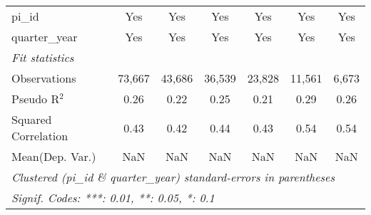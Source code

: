 \begin{tabular}{lcccccc}
   pi\_id                                                     & Yes           & Yes           & Yes           & Yes           & Yes           & Yes\\  
   quarter\_year                                              & Yes           & Yes           & Yes           & Yes           & Yes           & Yes\\  
   \midrule
   \emph{Fit statistics}\\
   Observations                                               & 73,667        & 43,686        & 36,539        & 23,828        & 11,561        & 6,673\\  
   Pseudo R$^2$                                               & 0.26          & 0.22          & 0.25          & 0.21          & 0.29          & 0.26\\  
   Squared Correlation                                        & 0.43          & 0.42          & 0.44          & 0.43          & 0.54          & 0.54\\  
Mean(Dep. Var.) & NaN & NaN & NaN & NaN & NaN & NaN \\
   \midrule \midrule
   \multicolumn{7}{l}{\emph{Clustered (pi\_id \& quarter\_year) standard-errors in parentheses}}\\
   \multicolumn{7}{l}{\emph{Signif. Codes: ***: 0.01, **: 0.05, *: 0.1}}\\
\end{tabular}
\par\endgroup
